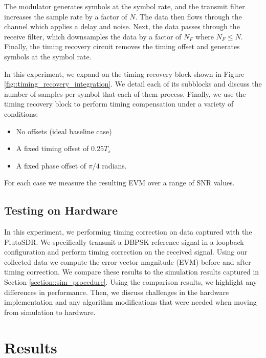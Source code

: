 \documentclass{article}
\begin{document}
\noindent The modulator generates symbols at the symbol rate, and the transmit filter increases the sample rate by a factor of $N$. The data then flows through the channel which applies a delay and noise. Next, the data passes through the receive filter, which downsamples the data by a factor of $N_F$ where $N_F \leq N$. Finally, the timing recovery circuit removes the timing offset and generates symbols at the symbol rate.

	In this experiment, we expand on the timing recovery block shown in Figure \ref{fig::timing_recovery_integration}. We detail each of its subblocks and discuss the number of samples per symbol that each of them process. Finally, we use the timing recovery block to perform timing compensation under a variety of conditions:
	
	\begin{itemize}
		\item No offsets (ideal baseline case)
		\item A fixed timing offset of $0.25T_s$
		\item A fixed phase offset of $\pi/4$ radians.
	\end{itemize}	
	
	\noindent For each case we measure the resulting EVM over a range of SNR values.
	
\subsection{Testing on Hardware}

In this experiment, we performing timing correction on data captured with the PlutoSDR. We specifically transmit a DBPSK reference signal in a loopback configuration and perform timing correction on the received signal. Using our collected data we compute the error vector magnitude (EVM) before and after timing correction. We compare these results to the simulation results captured in Section \ref{section::sim_procedure}. Using the comparison results, we highlight any differences in performance. Then, we discuss challenges in the hardware implementation and any algorithm modifications that were needed when moving from simulation to hardware.

\section{Results}
\end{document}

